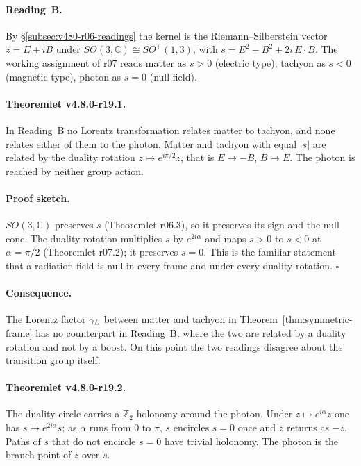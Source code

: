 \paragraph{Reading~B.}
By \S\ref{subsec:v480-r06-readings} the kernel is the Riemann--Silberstein vector \(z=E+iB\) under
\(SO(3,\mathbb C)\cong SO^+(1,3)\), with \(s=E^2-B^2+2i\,E\cdot B\).  The working assignment of r07 reads matter as
\(s>0\) (electric type), tachyon as \(s<0\) (magnetic type), photon as \(s=0\) (null field).

\paragraph{Theoremlet v4.8.0-r19.1.}
In Reading~B no Lorentz transformation relates matter to tachyon, and none relates either of them to the photon.
Matter and tachyon with equal \(|s|\) are related by the duality rotation \(z\mapsto e^{i\pi/2}z\), that is
\(E\mapsto-B\), \(B\mapsto E\).  The photon is reached by neither group action.

\paragraph{Proof sketch.}
\(SO(3,\mathbb C)\) preserves \(s\) (Theoremlet r06.3), so it preserves its sign and the null cone.  The duality
rotation multiplies \(s\) by \(e^{2i\alpha}\) and maps \(s>0\) to \(s<0\) at \(\alpha=\pi/2\)
(Theoremlet r07.2); it preserves \(s=0\).  This is the familiar statement that a radiation field is null in every
frame and under every duality rotation.  \(\square\)

\paragraph{Consequence.}
The Lorentz factor \(\gamma_L\) between matter and tachyon in Theorem~\ref{thm:symmetric-frame} has no counterpart in
Reading~B, where the two are related by a duality rotation and not by a boost.  On this point the two readings
disagree about the transition group itself.

\paragraph{Theoremlet v4.8.0-r19.2.}
The duality circle carries a \(\mathbb Z_2\) holonomy around the photon.  Under \(z\mapsto e^{i\alpha}z\) one has
\(s\mapsto e^{2i\alpha}s\); as \(\alpha\) runs from \(0\) to \(\pi\), \(s\) encircles \(s=0\) once and \(z\) returns as
\(-z\).  Paths of \(s\) that do not encircle \(s=0\) have trivial holonomy.  The photon is the branch point of
\(z\) over \(s\).

